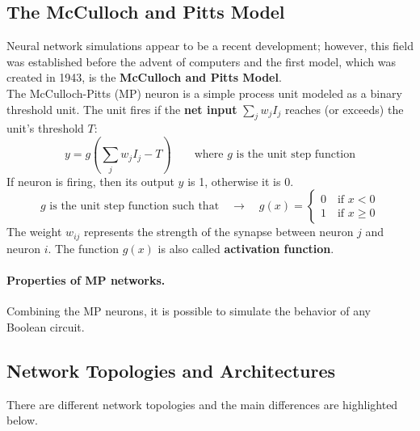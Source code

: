 \subsection{The McCulloch and Pitts Model}
Neural network simulations appear to be a recent development; however, this field was established before the advent of computers and the first model, which was created in 1943, is the \textbf{McCulloch and Pitts Model}.\\
The McCulloch-Pitts (MP) neuron is a simple process unit modeled as a binary threshold unit.
The unit fires if the \textbf{net input} $\sum_j w_jI_j$ reaches (or exceeds) the unit's threshold $T$:
$$y = g\left(\sum_j w_jI_j - T\right) \qquad \text{where } g \text{ is the unit step function}$$
If neuron is firing, then its output $y$ is 1, otherwise it is 0.
$$g \text{ is the unit step function such that} \quad \rightarrow \quad g(x) = 
\begin{cases}
0 \quad \text{if }x<0\\
1 \quad \text{if }x \geq 0
\end{cases}$$
The weight $w_{ij}$ represents the strength of the synapse between neuron $j$ and neuron $i$. The function $g(x)$ is also called \textbf{activation function}.

\paragraph*{Properties of MP networks.} Combining the MP neurons, it is possible to simulate the behavior of any Boolean circuit.

\subsection{Network Topologies and Architectures} There are different network topologies and the main differences are highlighted below.

